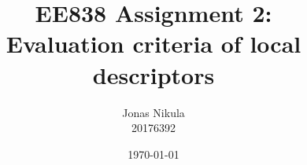 \documentclass{article}
\title{EE838 Assignment 2: \\
Evaluation criteria of local descriptors} %
\author{Jonas Nikula \\ 20176392} %
\date{\today} %
\begin{document}
\maketitle %





\printbibliography{}

\end{document}
